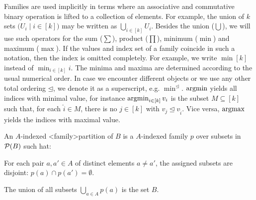 \documentclass[../document.tex]{subfiles}
\begin{document}
    Families are used implicitly in terms where an associative and commutative binary operation is lifted to a collection of elements.
    For example, the union of \(k\) sets \(\big(U_i \mid i \in [k]\big)\) may be written as \(\bigcup_{i \in [k]} U_i\).
    Besides the union (\(\bigcup\)), we will use such operators for the sum (\(\sum\)), product (\(\prod\)), minimum (\(\min\)) and maximum (\(\max\)).
    If the values and index set of a family coincide in such a notation, then the index is omitted completely.
    For example, we write \(\min [k]\) instead of \(\min_{i \in [k]} i\).
    The minima and maxima are determined according to the usual numerical order.
    In case we encounter different objects or we use any other total ordering \(\unlhd\), we denote it as a superscript, e.g. \(\min^{\unlhd}\).
    \(\operatorname{arg min}\) yields all indices with minimal value, for instance \(\operatorname{arg min}_{i \in [k]} v_i\) is the subset \(M \subseteq [k]\) such that, for each \(\hat{i} \in M\), there is no \(j \in [k]\) with \(v_j \unlhd v_{\hat{i}}\).
    Vice versa, \(\operatorname{arg max}\) yields the indices with maximal value.

    An \(A\)-indexed <family>{partition} of \(B\) is a \(A\)-indexed family \(p\) over subsets in \(\mathcal{P}(B)\) such hat:
    \begin{inparaenum}
        \item For each pair \(a, a' \in A\) of distinct elements \(a \neq a'\), the assigned subsets are disjoint: \(p(a) \cap p(a') = \emptyset\).
        \item The union of all subsets \(\bigcup_{a \in A} p(a)\) is the set \(B\).
    \end{inparaenum}
\end{document}
